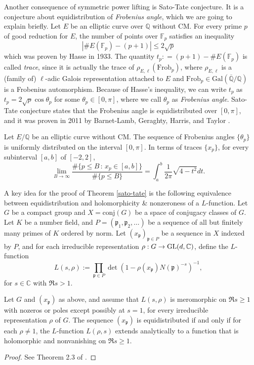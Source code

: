 Another consequence of symmetric power lifting is Sato-Tate conjecture.
It is a conjecture about equidistribution of \emph{Frobenius angle}, which we are going to explain briefly.
Let $E$ be an elliptic curve over $\mathbb{Q}$ without CM.
For every prime $p$ of good reduction for $E$, the number of points over $\mathbb{F}_{p}$ satisfies an inequality
$$
|\#E(\mathbb{F}_{p}) - (p + 1)| \leq 2\sqrt{p}
$$
which was proven by Hasse in 1933. The quantity $t_{p} : = (p + 1) - \#E(\mathbb{F}_{p})$ is called
\emph{trace}, since it is actually the trace of $\rho_{E, \ell}(\mathrm{Frob}_{p})$, where
$\rho_{E, \ell}$ is a (family of) $\ell$-adic Galois representation attached to $E$ and $\mathrm{Frob}_{p} \in \mathrm{Gal}(\overline{\mathbb{Q}} / \mathbb{Q})$
is a Frobenius automorphism.
Because of Hasse's inequality, we can write $t_{p}$ as $t_{p} = 2\sqrt{p}\cos\theta_{p}$ for some $\theta_{p} \in [0, \pi]$,
where we call $\theta_{p}$ as \emph{Frobenius angle}.
Sato-Tate conjecture states that the Frobenius angle is equidistributed over $[0, \pi]$,
and it was proven in 2011 by Barnet-Lamb, Geraghty, Harris, and Taylor \cite{barnet2011family}.

\begin{theorem}
\label{sato-tate}
Let $E/\mathbb{Q}$ be an elliptic curve without CM.
The sequence of Frobenius angles $\{\theta_{p}\}$ is uniformly distributed on the
interval $[0, \pi]$. In terms of traces $\{x_{p}\}$, for every subinterval $[a, b]$ of $[-2, 2]$,
$$
\lim_{B\to \infty} \frac{\#\{p\leq B\,:\, x_{p} \in [a, b]\}}{\#\{p\leq B\}} = \int_{a}^{b} \frac{1}{2\pi} \sqrt{4 - t^{2}} dt.
$$
\end{theorem}

A key idea for the proof of Theorem \ref{sato-tate} is the following equivalence between 
equidistribution and holomorphicity \& nonzeroness of a $L$-function.
Let $G$ be a compact group and $X = \mathrm{conj}(G)$ be a space of
conjugacy classes of $G$. Let $K$ be a number field, and $P = (\mathfrak{p}_{1}, \mathfrak{p}_{2}, \dots)$
be a sequence of all but finitely many primes of $K$ ordered by norm.
Let $(x_{\mathfrak{p}})_{\mathfrak{p}\in P}$ be a sequence in $X$ indexed by $P$, and for each
irreducible representation $\rho: G \to \operatorname{\mathrm{GL}}(d, \mathbb{C})$, define the $L$-function
$$
L(s, \rho) := \prod_{\mathfrak{p}\in P} \det(1 - \rho(x_{\mathfrak{p}})N(\mathfrak{p})^{-s})^{-1},
$$
for $s\in \mathbb{C}$ with $\Re s > 1$.

\begin{theorem}
\label{equidistribution}
Let $G$ and $(x_{\mathfrak{p}})$ as above, and assume that $L(s, \rho)$ is meromorphic on $\Re s \geq 1$
with nozeros or poles except possibly at $s=1$, for every irreducible representation $\rho$ of $G$.
The sequence $(x_{\mathfrak{p}})$ is equidistributed if and only if for each $\rho \neq 1$, the $L$-function
$L(\rho, s)$ extends analytically to a function that is holomorphic and nonvanishing on $\Re s \geq 1$.
\end{theorem}
\begin{proof}
See Theorem 2.3 of \cite{fite2015equidistribution}.
\end{proof}


